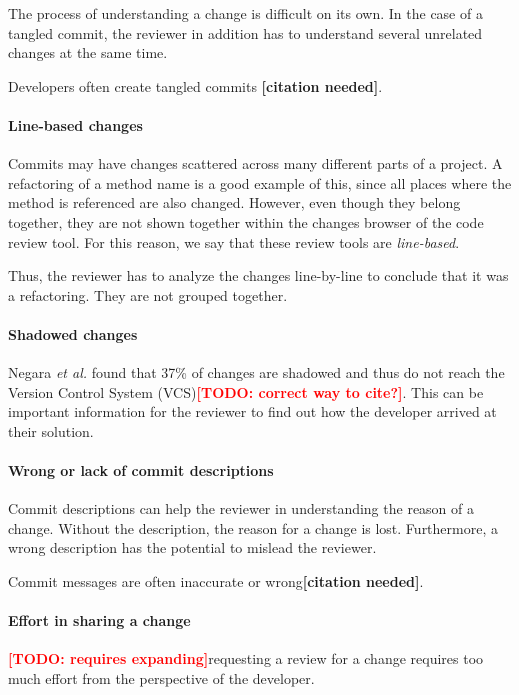 \documentclass[conference,a4paper]{IEEEtran}
\newcommand{\citeneeded}{\textbf{{[}citation needed{]}}}
\newcommand{\todo}[1]{\textbf{\textcolor{red}{{[}TODO: #1{]}}}}
\begin{document}
The process of understanding a change is difficult on its own. In the
case of a tangled commit, the reviewer in addition has to understand
several unrelated changes at the same time.

Developers often create tangled commits \citeneeded{}.

\paragraph{Line-based changes}

Commits may have changes scattered across many different parts of a
project. A refactoring of a method name is a good example of this,
since all places where the method is referenced are also
changed. However, even though they belong together, they are not shown
together within the changes browser of the code review tool. For this
reason, we say that these review tools are \textit{line-based}.

Thus, the reviewer has to analyze the changes line-by-line to conclude
that it was a refactoring. They are not grouped together.

\paragraph{Shadowed changes}

Negara \textit{et al.} found that 37\% of changes are shadowed and
thus do not reach the Version Control System
(VCS)\cite{Nega12a}\todo{correct way to cite?}. This can
be important information for the reviewer to find out how the
developer arrived at their solution.

\paragraph{Wrong or lack of commit descriptions}

Commit descriptions can help the reviewer in understanding the reason
of a change. Without the description, the reason for a change is
lost. Furthermore, a wrong description has the potential to mislead
the reviewer.

Commit messages are often inaccurate or wrong\citeneeded{}.

\paragraph{Effort in sharing a change}

\todo{requires expanding}requesting a review for a change requires too
much effort from the perspective of the developer.
\end{document}
